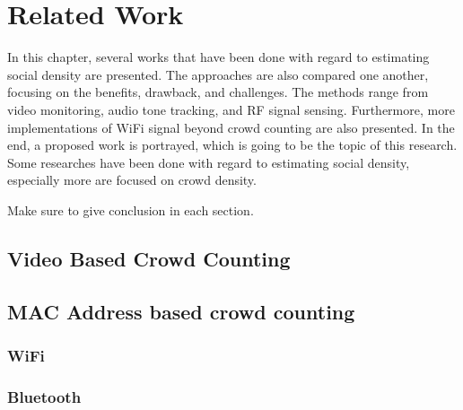 \chapter{Related Work}\label{ch:related-work}


In this chapter, several works that have been done with regard to estimating social density are presented. The approaches are also compared one another, focusing on the benefits, drawback, and challenges. The methods range from video monitoring, audio tone tracking, and RF signal sensing. Furthermore, more implementations of WiFi signal beyond crowd counting are also presented. In the end, a proposed work is portrayed, which is going to be the topic of this research.
Some researches have been done with regard to estimating social density, especially more are focused on crowd density.

Make sure to give conclusion in each section.

\section{Video Based Crowd Counting} %
\label{sec:video_based_crowd_counting}




\section{MAC Address based crowd counting} %
\label{sec:mac_address_based_crowd_counting}

\subsection{WiFi} %
\label{sub:wifi}


\subsection{Bluetooth} %
\label{sub:bluetooth}


